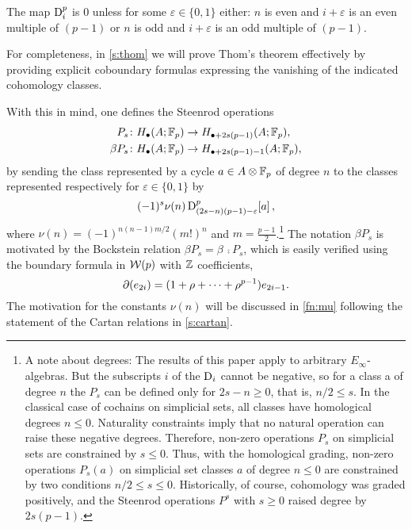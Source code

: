 \begin{theorem}[Thom]\label{t:thom}
	The map $\mathrm{D}_i^p$ is $0$ unless for some $\varepsilon \in \{0,1\}$ either: $n$ is even and $i+\varepsilon$ is an even multiple of $(p-1)$ or $n$ is odd and $i+\varepsilon$ is an odd multiple of $(p-1)$.
\end{theorem}

For completeness, in \cref{s:thom} we will prove Thom's theorem effectively by providing explicit coboundary formulas expressing the vanishing of the indicated cohomology classes.

With this in mind, one defines the Steenrod operations
\begin{align*}
	P_s \colon& H_\bullet(A; {\mathbb{F}_p}) \to H_{\bullet + 2s(p-1)}(A; {\mathbb{F}_p}), \\
	\beta P_s \colon& H_\bullet(A; {\mathbb{F}_p}) \to H_{\bullet + 2s(p-1) - 1}(A; {\mathbb{F}_p}),
\end{align*}
by sending the class represented by a cycle $a \in A \otimes {\mathbb{F}_p}$ of degree $n$ to the classes represented respectively for $\varepsilon \in \{0,1\}$ by
\[
(-1)^s \nu(n) \, \mathrm{D}^p_{(2s-n)(p-1)-\varepsilon}[a] \,,
\]
where $\nu(n) = (-1)^{n(n-1)m/2}(m!)^n$ and $m = \frac{p-1}{2}$.\footnote{
	A note about degrees:
	The results of this paper apply to arbitrary $E_\infty$-algebras.
	But the subscripts $i$ of the $\mathrm{D}_i$ cannot be negative, so for a class a of degree $n$ the $P_s$ can be defined only for $2s-n \geq 0$, that is, $n/2 \leq s$.
	In the classical case of cochains on simplicial sets, all classes have homological degrees $n \leq 0$.
	Naturality constraints imply that no natural operation can raise these negative degrees.
	Therefore, non-zero operations $P_s$ on simplicial sets are constrained by $s \leq 0$.
	Thus, with the homological grading, non-zero operations $P_s(a)$ on simplicial set classes $a$ of degree $n \leq 0$ are constrained by two conditions $n/2 \leq s \leq 0$.
	Historically, of course, cohomology was graded positively, and the Steenrod operations $P^s$ with $s \geq 0$ raised degree by $2s(p-1)$.
}
The notation $\beta P_s$ is motivated by the Bockstein relation $\beta P_s = \beta\, \comp P_s$, which is easily verified using the boundary formula in $\mathcal{W}(p)$ with $\mathbb{Z}$ coefficients,
\[
\operatorname{\partial}(e_{2i}) = (1 + \rho + \dots + \rho^{p-1})e_{2i-1}.
\]
The motivation for the constants $\nu(n)$ will be discussed in \cref{fn:mu} following the statement of the Cartan relations in \cref{s:cartan}.